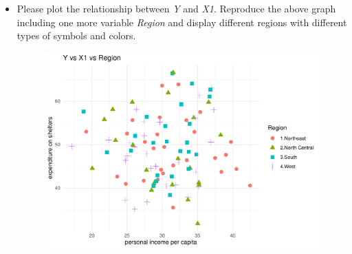 \documentclass[12pt,letterpaper]{article}
\begin{document}
\begin{itemize}
\item
Please plot the relationship between \emph{Y} and \emph{X1}. Reproduce the above graph including one more variable \emph{Region} and display different regions with different types of symbols and colors.


\begin{figure}[h!]\centering
	\label{fig:plot_1}
	\includegraphics[width=.75\textwidth]{plot_example8.pdf}
\end{figure}

\end{itemize}
\end{document}
